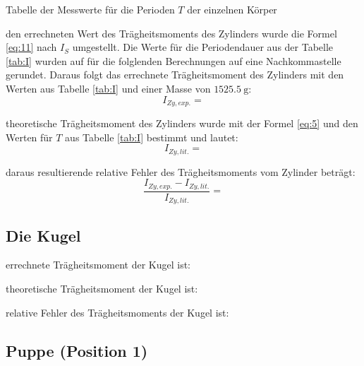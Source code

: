\begin{table}[H]
    \centering
    
    \caption{Tabelle der Messwerte für die Perioden $T$ der einzelnen Körper}
    \label{tab:I}
\end{table}


\justifying den errechneten Wert des Trägheitsmoments des Zylinders wurde die Formel \eqref{eq:11} nach $I_S$ umgestellt.
Die Werte für die Periodendauer aus der Tabelle \ref{tab:I} wurden auf für die folglenden Berechnungen auf eine Nachkommastelle gerundet.
Daraus folgt das errechnete Trägheitsmoment des Zylinders mit den Werten aus Tabelle \ref{tab:I} und einer Masse von $\SI{1525.5}{\gram}$:
\begin{equation}
I_{Zy, exp.} = \label{eq:18}
\end{equation}

\justifying theoretische Trägheitsmoment des Zylinders wurde mit der Formel \eqref{eq:5} und den Werten für $T$ aus Tabelle 
\ref{tab:I} bestimmt und lautet:
\begin{equation}
I_{Zy, lit.} = \label{eq:19}
\end{equation}

\justifying daraus resultierende relative Fehler des Trägheitsmoments vom Zylinder beträgt:
\begin{equation}
\frac{I_{Zy, exp.} - I_{Zy, lit.}}{I_{Zy, lit.}} = \label{eq:20}
\end{equation}
\newpage

\subsection{Die Kugel}\justifying %

\justifying errechnete Trägheitsmoment der Kugel ist:


\justifying theoretische Trägheitsmoment der Kugel ist:


\justifying relative Fehler des Trägheitsmoments der Kugel ist:


\subsection{Puppe (Position 1)}\justifying %

